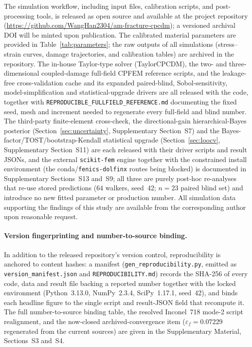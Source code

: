 \documentclass[12pt,a4paper,twocolumn]{article}
\begin{document}
The simulation workflow, including input files, calibration scripts, and post-processing tools, is released as open source and available at the project repository (\url{https://github.com/WangHan2304/am-fracture-cpcdm}); a versioned archival DOI will be minted upon publication. The calibrated material parameters are provided in Table~\ref{tab:parameters}; the raw outputs of all simulations (stress--strain curves, damage trajectories, and calibration tables) are archived in the repository. The in-house Taylor-type solver (TaylorCPCDM), the two- and three-dimensional coupled-damage full-field CPFEM reference scripts, and the leakage-free cross-validation cache and its expanded paired-blind, Sobol-sensitivity, model-simplification and statistical-upgrade drivers are all released with the code, together with \texttt{REPRODUCIBLE\_FULLFIELD\_REFERENCE.md} documenting the fixed seed, mesh and increment needed to regenerate every full-field and blind number. The third-party finite-element cross-check, the directional-gain hierarchical-Bayes posterior (Section~\ref{sec:uncertainty}, Supplementary Section~S7) and the Bayes-factor/TOST/bootstrap-Kendall statistical upgrade (Section~\ref{sec:loocv}, Supplementary Section~S11) are each released with their driver scripts and result JSONs, and the external \texttt{scikit-fem} engine together with the constrained install environment (the conda/\texttt{fenics-dolfinx} routes being blocked) is documented in Supplementary Sections~S13 and~S9; all three are purely post-hoc re-analyses that re-use stored predictions ($64$ walkers, seed~42; $n=23$ paired blind set) and introduce no new fitted parameter or production number. All simulation data supporting the findings of this study are available from the corresponding author upon reasonable request.

\paragraph{Version fingerprinting and number-to-source binding.} In addition to the released repository's version control, reproducibility is anchored to content hashes: a manifest (\texttt{gen\_reproducibility.py}, emitted as \texttt{version\_manifest.json} and \texttt{REPRODUCIBILITY.md}) records the SHA-256 of every code, data and result file backing a reported number together with the locked environment (Python~3.13.0, NumPy~2.3.4, SciPy~1.17.1, seed~42), and binds each headline figure to the single script and result-JSON field that recompute it. The full number-to-source binding table, the resolved Inconel~718 mode-2 script realignment, and the now-closed archived-convergence item ($\varepsilon_f = 0.07229$ regenerated from the current sources) are given in the Supplementary Material, Sections~S3 and~S4.
\end{document}

